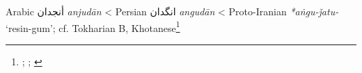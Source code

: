 \begin{etymology}\label{ety:anjudan}
Arabic {أنجدان} \textit{anjudān}
< Persian {انگدان‎} \textit{angudān}
< Proto-Iranian \textit{*aṅgu-ǰatu-} `resin-gum'; cf. Tokharian B, Khotanese\footnote{\textcite[79-80]{lane_arabic-english_1863}; \textcite[114, 106]{steingass_comprehensive_1892}; \textcite[7]{adams_dictionary_2013}}
\end{etymology}
